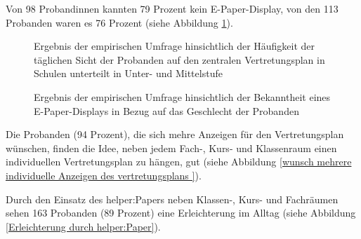 \documentclass[10pt]{article}
\begin{document}
Von 98 Probandinnen kannten 79 Prozent kein E-Paper-Display, von den 113 Probanden waren es 76 Prozent (siehe Abbildung \ref{Bekanntheit E-Paper}).
\begin{figure}[H]
  \centering
  \begin{minipage}[b]{0.49\textwidth}
    
  \caption{Ergebnis der empirischen Umfrage hinsichtlich der Häufigkeit der täglichen Sicht der Probanden auf den zentralen Vertretungsplan in Schulen unterteilt in Unter- und Mittelstufe}
  \label{Häufigkeit Sicht auf den Vertretungsplan}
  \end{minipage}
  \hfill
  \begin{minipage}[b]{0.49\textwidth}
    
  \caption{Ergebnis der empirischen Umfrage hinsichtlich der Bekanntheit eines E-Paper-Displays in Bezug auf das Geschlecht der Probanden\\}
  \label{Bekanntheit E-Paper}
  \end{minipage}
\end{figure}

Die Probanden (94 Prozent), die sich mehre Anzeigen für den Vertretungsplan wünschen, finden die Idee, neben jedem Fach-, Kurs- und Klassenraum einen individuellen Vertretungsplan zu hängen, gut (siehe Abbildung \ref{wunsch mehrere individuelle Anzeigen des vertretungsplans }).

Durch den Einsatz des helper:Papers neben Klassen-, Kurs- und Fachräumen sehen 163 Probanden (89 Prozent) eine Erleichterung im Alltag (siehe Abbildung \ref{Erleichterung durch helper:Paper}). 
\end{document}

